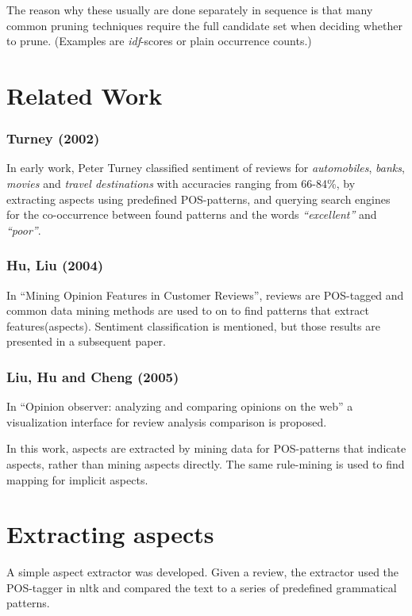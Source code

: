 \documentclass[a4paper,11pt]{kth-mag}
\begin{document}
The reason why these usually are done separately in sequence is that many common pruning
techniques require the full candidate set when deciding whether to prune.
(Examples are \emph{idf}-scores or plain occurrence counts.)


\section{Related Work}

\subsubsection{Turney (2002)}
In early work, Peter Turney classified sentiment of reviews for \emph{automobiles}, \emph{banks}, \emph{movies} and \emph{travel destinations} with accuracies ranging from 66-84\%, by extracting aspects using predefined POS-patterns, and querying search engines for the co-occurrence between found patterns and the words \emph{``excellent''} and \emph{``poor''}.

\subsubsection{Hu, Liu (2004)}
In ``Mining Opinion Features in Customer Reviews'', reviews are POS-tagged and common data
mining methods are used to on to find patterns that extract features(aspects).
Sentiment classification is mentioned, but those results are presented in a subsequent paper.

\subsubsection{Liu, Hu and Cheng (2005)}
In ``Opinion observer: analyzing and comparing opinions on the web'' a visualization interface
for review analysis comparison is proposed.

In this work, aspects are extracted by mining data for POS-patterns that indicate aspects,
rather than mining aspects directly. The same rule-mining is used to find mapping for implicit aspects.

\newpage
\section{Extracting aspects}
A simple aspect extractor was developed. Given a review, the extractor used the
POS-tagger in nltk\cite{nltk} and compared the text to a series of predefined grammatical patterns.
\end{document}
